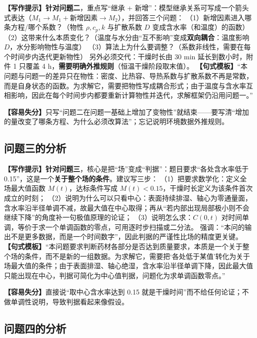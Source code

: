 \documentclass[12pt,a4paper]{article}
\newcommand{\prompt}[1]{\par\noindent\textbf{【写作提示】}#1\par}      %
\newcommand{\pitfall}[1]{\par\noindent\textbf{【容易失分】}#1\par}     %
\begin{document}
\prompt{\textbf{针对问题二}，重点写“继承 + 新增”：模型继承关系可写成一个箭头式表达（$M_1 \rightarrow M_1+\text{新增因素} \rightarrow M_2$），并回答三个问题：
（1）新增因素进入哪条方程/哪个系数？（物性 $\rho,c_p,k$ 与扩散系数 $D$ 变成含水率（和温度）的函数）
（2）这带来什么本质变化？（温度与水分由“互不影响”变成\textbf{双向耦合}：温度影响 $D$，水分影响物性与温度）
（3）算法上为什么要调整？（系数非线性，需要在每个时间步内迭代更新物性）
另外必须交代：干燥时长由 30 min 延长到数小时，附件 1 只覆盖 4 h，\textbf{需要明确外推规则}（恒温干燥阶段取末值）。
\textbf{【句式模板】}“本问题与问题一的差异只在物性：密度、比热容、导热系数与扩散系数不再是常数，而是自身状态的函数。为求解它，需要把物性写成耦合形式；由于温度与含水率互相影响，因此在每个时间步内都要重新计算物性并迭代，求解框架仍沿用问题一。”}

\pitfall{只写“问题二在问题一基础上增加了变物性”就结束——要写清“增加的量改变了哪条方程、为什么必须改算法”；忘记说明环境数据外推规则。}

\subsection{问题三的分析}

\prompt{\textbf{针对问题三}，核心是把“场”变成“判据”：题目要求“各处含水率低于 0.15”，这是一个\textbf{关于整个场的条件}。建议写三步：
（1）把要求数学化：定义全场最大值函数 $M(t)$，达标条件写成 $M(t)<0.15$，干燥时长定义为该条件首次成立的时刻；
（2）说明为什么可以只看中心：表面持续排湿、轴心为零通量面，含水率沿半径单调不减，故最大值在中心取得；再从“若内部出现局部极小则不会继续下降”的角度补一句极值原理的论证；
（3）说明怎么求：$C(0,t)$ 对时间单调，等价于求一个单调函数的零点，可用逐时步扫描或二分法。
强调：“本问的输出不是更多数据，而是一个时间数字”，因此判据的严谨性比场的精度更关键。
\textbf{【句式模板】}“本问题要求判断药材各部分是否达到质量要求，本质是一个关于整个场的条件，而不是新的一组数据。为求解它，需要把‘各处低于某值’转化为关于场最大值的条件；由于表面排湿、轴心绝湿，含水率沿半径单调下降，因此最大值只能出现在中心，判据可简化为中心值判据，问题化为求单调函数零点。”}

\pitfall{直接说“取中心含水率达到 0.15 就是干燥时间”而不给任何论证；不做单调性说明，导致判据看起来像假设。}

\subsection{问题四的分析}
\end{document}
